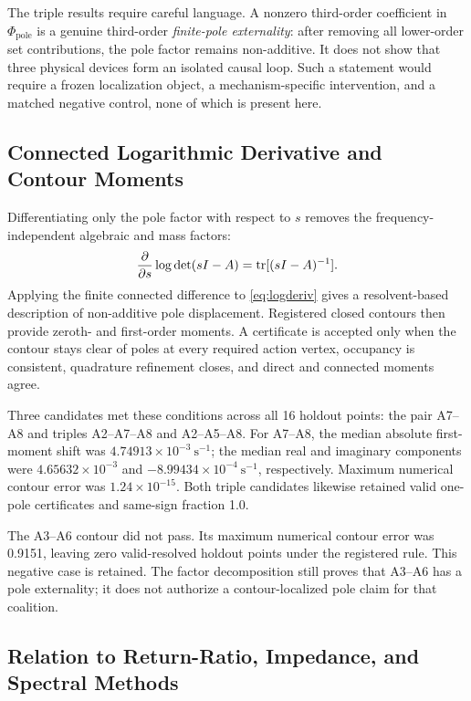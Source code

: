 The triple results require careful language. A nonzero third-order coefficient
in $\Phi_{\mathrm{pole}}$ is a genuine third-order \emph{finite-pole
externality}: after removing all lower-order set contributions, the pole
factor remains non-additive. It does not show that three physical devices
form an isolated causal loop. Such a statement would require a frozen
localization object, a mechanism-specific intervention, and a matched negative
control, none of which is present here.

\subsection{Connected Logarithmic Derivative and Contour Moments}

Differentiating only the pole factor with respect to $s$ removes the
frequency-independent algebraic and mass factors:
\begin{equation}
\frac{\partial}{\partial s}\log\det(sI-A)
=\operatorname{tr}[(sI-A)^{-1}].
\label{eq:logderiv}
\end{equation}
Applying the finite connected difference to \eqref{eq:logderiv} gives a
resolvent-based description of non-additive pole displacement. Registered
closed contours then provide zeroth- and first-order moments. A certificate is
accepted only when the contour stays clear of poles at every required action
vertex, occupancy is consistent, quadrature refinement closes, and direct and
connected moments agree.

Three candidates met these conditions across all 16 holdout points: the pair
A7--A8 and triples A2--A7--A8 and A2--A5--A8. For A7--A8, the median absolute
first-moment shift was $4.74913\times10^{-3}\ \mathrm{s}^{-1}$; the median
real and imaginary components were $4.65632\times10^{-3}$ and
$-8.99434\times10^{-4}\ \mathrm{s}^{-1}$, respectively. Maximum numerical
contour error was $1.24\times10^{-15}$. Both triple candidates likewise
retained valid one-pole certificates and same-sign fraction 1.0.

The A3--A6 contour did not pass. Its maximum numerical contour error was
0.9151, leaving zero valid-resolved holdout points under the registered rule.
This negative case is retained. The factor decomposition still proves that
A3--A6 has a pole externality; it does not authorize a contour-localized pole
claim for that coalition.

\subsection{Relation to Return-Ratio, Impedance, and Spectral Methods}

